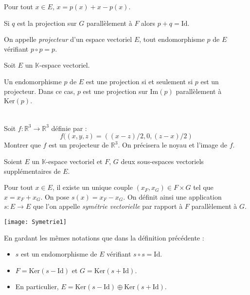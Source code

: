 \documentclass[a4paper,10pt]{report}
\begin{document}
\begin{rems} 
\item Pour tout $x \in E$, $x=p(x)+x-p(x)$. 
\item Si $q$ est la projection sur $G$ parallèlement à $F$ alors $p+q=\textrm{Id}$.
\end{rems}

\begin{defin} On appelle \textit{projecteur} d'un espace vectoriel $E$, tout endomorphisme $p$ de $E$ vérifiant $p \circ p = p$.
\end{defin}

\begin{prop} Soit $E$ un $\mathbb{K}$-espace vectoriel.

\noindent Un endomorphisme $p$ de $E$ est une projection si et seulement si $p$ est un projecteur. Dans ce cas, $p$ est une projection sur $\textrm{Im}(p)$ parallèlement à $\textrm{Ker}(p)$.
\end{prop}

\begin{preuve}
\vspace{12cm}
\newpage

$\phantom{tes}$

\vspace{11cm}
\end{preuve}

\begin{exa} Soit $f : \mathbb{R}^3 \rightarrow \mathbb{R}^3$ définie par :
$$ f((x,y,z)=((x-z)/2,0,(z-x)/2)$$
Montrer que $f$ est un projecteur de $\mathbb{R}^3$. On précisera le noyau et l'image de $f$.
\end{exa}

\begin{defin} Soient $E$ un $\mathbb{K}$-espace vectoriel et $F$, $G$ deux sous-espaces vectoriels supplémentaires de $E$.

\noindent Pour tout $x \in E$, il existe un unique couple $(x_F,x_G) \in F \times G$ tel que $x=x_F+x_G$. On pose \newline $s(x)=x_F-x_G$. On définit ainsi une application $s : E \rightarrow E$ que l'on appelle \textit{symétrie vectorielle} par rapport à $F$ parallèlement à $G$. 
\end{defin}

\begin{center}
\texttt{[image: Symetrie1]}
\end{center}

\begin{prop} En gardant les mêmes notations que dans la définition précédente :
\begin{itemize}
\item $s$ est un endomorphisme de $E$ vérifiant $s \circ s = \textrm{Id}$.
\item $F = \textrm{Ker}(s-\textrm{Id})$ et $G= \textrm{Ker}(s+\textrm{Id})$.
\item En particulier, $E= \textrm{Ker}(s-\textrm{Id}) \oplus \textrm{Ker}(s+\textrm{Id})$.
\end{itemize}
\end{prop}
\end{document}
